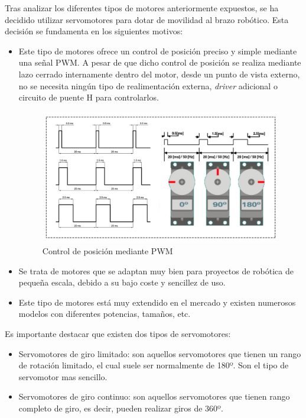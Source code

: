 Tras analizar los diferentes tipos de motores anteriormente expuestos, se ha decidido utilizar servomotores para dotar de movilidad al brazo robótico. Esta decisión se fundamenta en los siguientes motivos:
\begin{itemize}
    \item Este tipo de motores ofrece un control de posición preciso y simple mediante una señal PWM. A pesar de que dicho control de posición se realiza mediante lazo cerrado internamente dentro del motor, desde un punto de vista externo, no se necesita ningún tipo de realimentación externa, \textit{driver} adicional o circuito de puente H para controlarlos.
    
    \begin{figure}[h!]
    \centering 
    \includegraphics[width=.6\linewidth]{pictures/Senal_PWM.jpg}
    \caption{Control de posición mediante PWM \cite{noauthor_zona_nodate}}
    \label{fig:}
    \end{figure}

    
    \item Se trata de motores que se adaptan muy bien para proyectos de robótica de pequeña escala, debido a su bajo coste y sencillez de uso.
    
    \item Este tipo de motores está muy extendido en el mercado y existen numerosos modelos con diferentes potencias, tamaños, etc.
\end{itemize}

Es importante destacar que existen dos tipos de servomotores:
\begin{itemize}
    \item Servomotores de giro limitado: son aquellos servomotores que tienen un rango de rotación limitado, el cual suele ser normalmente de 180º. Son el tipo de servomotor mas sencillo.
    \item Servomotores de giro continuo: son aquellos servomotores que tienen rango completo de giro, es decir, pueden realizar giros de 360º.
\end{itemize}


